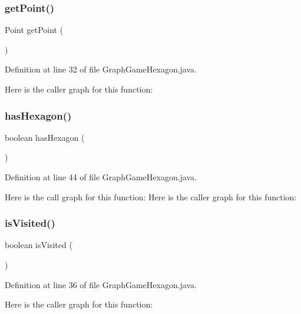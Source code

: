\subsubsection{get\+Point()}
{\footnotesize\ttfamily Point get\+Point (\begin{DoxyParamCaption}{ }\end{DoxyParamCaption})}



Definition at line 32 of file Graph\+Game\+Hexagon.\+java.

Here is the caller graph for this function\+:
\mbox{\label{classsf_1_1unitingtwist_1_1_graph_game_hexagon_ab614a366b275084140dc6b158d395887}} 
\subsubsection{has\+Hexagon()}
{\footnotesize\ttfamily boolean has\+Hexagon (\begin{DoxyParamCaption}{ }\end{DoxyParamCaption})}



Definition at line 44 of file Graph\+Game\+Hexagon.\+java.

Here is the call graph for this function\+:
Here is the caller graph for this function\+:
\mbox{\label{classsf_1_1unitingtwist_1_1_graph_game_hexagon_a2d5373d59efa89d4024c56515402d097}} 
\subsubsection{is\+Visited()}
{\footnotesize\ttfamily boolean is\+Visited (\begin{DoxyParamCaption}{ }\end{DoxyParamCaption})}



Definition at line 36 of file Graph\+Game\+Hexagon.\+java.

Here is the caller graph for this function\+:
\mbox{\label{classsf_1_1unitingtwist_1_1_graph_game_hexagon_ab7cc2c8053e69fc895733a067c8aa26b}} 

